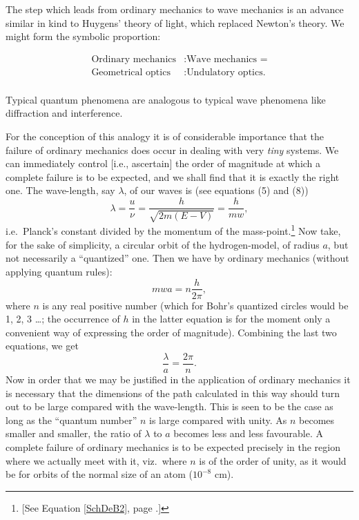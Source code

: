 The step which leads from ordinary mechanics to wave mechanics is an
advance similar in kind to Huygens' theory of light, which replaced
Newton's theory. We might form the symbolic proportion:
\begin{center}
\begin{align*}
\text{Ordinary mechanics} &: \text{Wave mechanics =}\\
\text{Geometrical optics} &: \text{Undulatory optics.}\\
\end{align*}
\end{center}
Typical quantum phenomena are analogous to typical wave phenomena like
diffraction and interference.

For the conception of this analogy it is of considerable importance that
the failure of ordinary mechanics does occur in dealing with very
\emph{tiny} systems. We can immediately control {[}i.e., ascertain{]}
the order of magnitude at which a complete failure is to be expected,
and we shall find that it is exactly the right one. The wave-length, say
$\lambda$, of our waves is (see equations (5) and (8))
\begin{equation}
\lambda = \frac{u}{\nu} = \frac{h}{\sqrt{2m(E-V)}} = \frac{h}{mw} ,
\end{equation}
i.e.\ Planck's constant divided by the momentum of the
mass-point.\footnote{{[}See Equation \eqref{SchDeB2}, page \pageref{SchDeB2}.{]}} Now take, for
the sake of simplicity, a circular orbit of the hydrogen-model, of
radius $a$, but not necessarily a ``quantized'' one. Then we have
by ordinary mechanics (without applying quantum rules):
\begin{equation*}
mwa = n\frac{h}{2\pi} , 
\end{equation*}
where $n$ is any real positive number (which for Bohr's quantized
circles would be 1, 2, 3 \ldots ; the occurrence of $h$ in the
latter equation is for the moment only a convenient way of expressing
the order of magnitude). Combining the last two equations, we get
\begin{equation*}
\frac{\lambda}{a} = \frac{2\pi}{n}.
\end{equation*}
Now in order that we may be justified in the application of ordinary
mechanics it is necessary that the dimensions of the path calculated in
this way should turn out to be large compared with the wave-length. This
is seen to be the case as long as the ``quantum number'' $n$ is
large compared with unity. As $n$ becomes smaller and smaller, the
ratio of $\lambda$ to $a$ becomes less and less favourable. A
complete failure of ordinary mechanics is to be expected precisely in
the region where we actually meet with it, viz.\ where $n$ is of the
order of unity, as it would be for orbits of the normal size of an atom
($10^{-8}$ cm).

